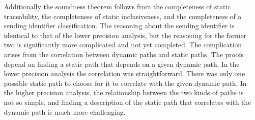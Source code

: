 \documentclass[letterpaper, 11pt]{extarticle}
\begin{document}
Additionally the soundness theorem follows from the completeness of static traceability,
the completeness of static inclusiveness, and the completeness of a sending identifier classification. 
The reasoning about the sending identifier is identical to that of the lower precision analysis, but
the reasoning for the former two is significantly more complicated and not yet completed.
The complication arises from the
correlation between dynamic paths and static paths.  The proofs depend on finding a static 
path that depends on a given dynamic path. In the lower precision analysis the
correlation was straightforward. There was only one possible static path to choose for it
to correlate with the given dynamic path. In the higher precision analysis, the relationship
between the two kinds of paths is not so simple, and finding a description of the static path
that correlates with the dynamic path is much more challenging.
\end{document}
